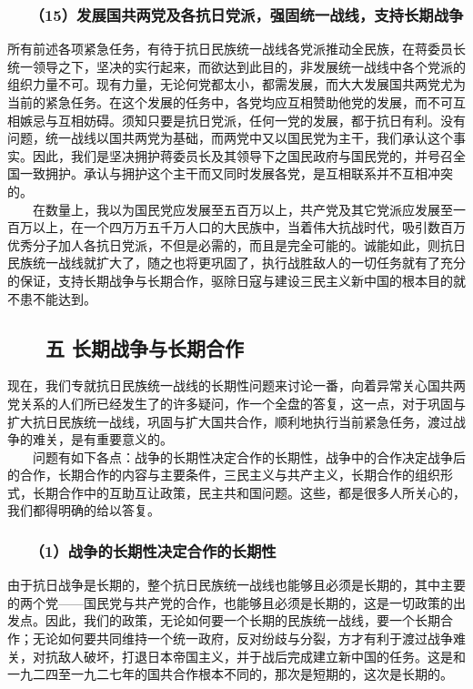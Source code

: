 \documentclass[cn,11pt,chinese]{elegantbook}
\def\myformat#1{\hfil\hfil #1}
\begin{document}
\subsubsection*{\myformat{　　（15）发展国共两党及各抗日党派，强固统一战线，支持长期战争}}
所有前述各项紧急任务，有待于抗日民族统一战线各党派推动全民族，在蒋委员长统一领导之下，坚决的实行起来，而欲达到此目的，非发展统一战线中各个党派的组织力量不可。现有力量，无论何党都太小，都需发展，而大大发展国共两党尤为当前的紧急任务。在这个发展的任务中，各党均应互相赞助他党的发展，而不可互相嫉忌与互相妨碍。须知只要是抗日党派，任何一党的发展，都于抗日有利。没有问题，统一战线以国共两党为基础，而两党中又以国民党为主干，我们承认这个事实。因此，我们是坚决拥护蒋委员长及其领导下之国民政府与国民党的，并号召全国一致拥护。承认与拥护这个主干而又同时发展各党，是互相联系并不互相冲突的。\\
　　在数量上，我以为国民党应发展至五百万以上，共产党及其它党派应发展至一百万以上，在一个四万万五千万人口的大民族中，当着伟大抗战时代，吸引数百万优秀分子加人各抗日党派，不但是必需的，而且是完全可能的。诚能如此，则抗日民族统一战线就扩大了，随之也将更巩固了，执行战胜敌人的一切任务就有了充分的保证，支持长期战争与长期合作，驱除日寇与建设三民主义新中国的根本目的就不患不能达到。\\
\subsection*{\myformat{　　五 长期战争与长期合作}}
现在，我们专就抗日民族统一战线的长期性问题来讨论一番，向着异常关心国共两党关系的人们所已经发生了的许多疑问，作一个全盘的答复，这一点，对于巩固与扩大抗日民族统一战线，巩固与扩大国共合作，顺利地执行当前紧急任务，渡过战争的难关，是有重要意义的。\\
　　问题有如下各点：战争的长期性决定合作的长期性，战争中的合作决定战争后的合作，长期合作的内容与主要条件，三民主义与共产主义，长期合作的组织形式，长期合作中的互助互让政策，民主共和国问题。这些，都是很多人所关心的，我们都得明确的给以答复。\\
\subsubsection*{\myformat{　　（1）战争的长期性决定合作的长期性}}
由于抗日战争是长期的，整个抗日民族统一战线也能够且必须是长期的，其中主要的两个党——国民党与共产党的合作，也能够且必须是长期的，这是一切政策的出发点。因此，我们的政策，无论如何要一个长期的民族统一战线，要一个长期合作；无论如何要共同维持一个统一政府，反对纷歧与分裂，方才有利于渡过战争难关，对抗敌人破坏，打退日本帝国主义，并于战后完成建立新中国的任务。这是和一九二四至一九二七年的国共合作根本不同的，那次是短期的，这次是长期的。\\
\end{document}
